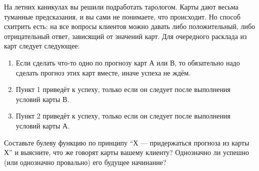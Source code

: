 \question
На летних каникулах вы решили подработать тарологом. Карты дают весьма туманные предсказания, и вы сами не понимаете, что происходит. Но способ схитрить есть: на все вопросы клиентов можно давать либо положительный, либо отрицательный ответ, зависящий от значений карт. Для очередного расклада из карт следует следующее:

\begin{enumerate}
\item Если сделать что-то одно по прогнозу карт А или В, то обязательно надо сделать прогноз этих карт вместе, иначе успеха не ждём.
\item Пункт 1 приведёт к успеху, только если он следует после выполнения условий карты В.
\item Пункт 2 приведёт к успеху, только если он следует после выполнения условий карты А.
\end{enumerate}

Составьте булеву функцию по принципу “Х — придержаться прогноза из карты Х” и выясните, что же говорят карты вашему клиенту? Однозначно ли успешно (или однозначно провально) его будущее начинание?